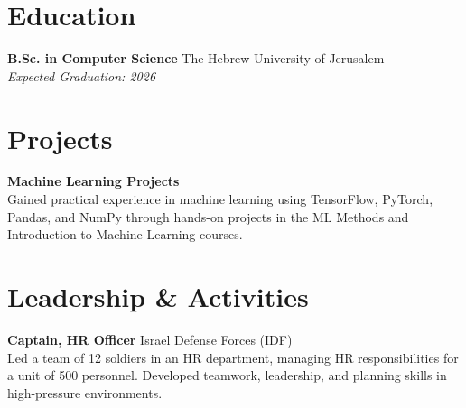 \documentclass[a4paper,10pt]{article}
\begin{document}
\section*{Education}
\textbf{B.Sc. in Computer Science} \hfill The Hebrew University of Jerusalem \\
\textit{Expected Graduation: 2026}

\section*{Projects}
\textbf{Machine Learning Projects} \\
Gained practical experience in machine learning using TensorFlow, PyTorch, Pandas, and NumPy through hands-on projects in the ML Methods and Introduction to Machine Learning courses. 

\section*{Leadership \& Activities}
\textbf{Captain, HR Officer} \hfill Israel Defense Forces (IDF) \\
Led a team of 12 soldiers in an HR department, managing HR responsibilities for a unit of 500 personnel. Developed teamwork, leadership, and planning skills in high-pressure environments.
\end{document}
